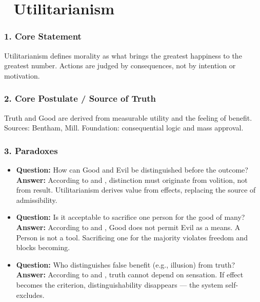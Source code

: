 \documentclass[12pt]{article}
\begin{document}
\section*{🔷 Utilitarianism}

\subsubsection*{1. Core Statement}

Utilitarianism defines morality as what brings the greatest happiness to the greatest number. Actions are judged by consequences, not by intention or motivation.

\subsubsection*{2. Core Postulate / Source of Truth}

Truth and Good are derived from measurable utility and the feeling of benefit. Sources: Bentham, Mill. Foundation: consequential logic and mass approval.

\subsubsection*{3. Paradoxes}

\begin{itemize}
\item \textbf{Question:} How can Good and Evil be distinguished before the outcome?  
\\ \textbf{Answer:} According to \text{[4.1]} and \text{[4.3]}, distinction must originate from volition, not from result. Utilitarianism derives value from effects, replacing the source of admissibility.

\item \textbf{Question:} Is it acceptable to sacrifice one person for the good of many?  
\\ \textbf{Answer:} According to \text{[11.3]} and \text{[4.4]}, Good does not permit Evil as a means. A Person is not a tool. Sacrificing one for the majority violates freedom and blocks becoming.

\item \textbf{Question:} Who distinguishes false benefit (e.g., illusion) from truth?  
\\ \textbf{Answer:} According to \text{[1]} and \text{[11.2]}, truth cannot depend on sensation. If effect becomes the criterion, distinguishability disappears — the system self-excludes.
\end{itemize}
\end{document}
